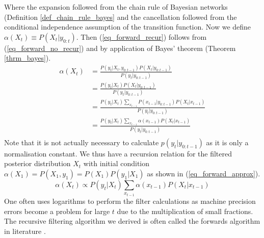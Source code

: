 Where the expansion followed from the chain rule of Bayesian networks (Definition \ref{def_chain_rule_bayes} and the cancellation followed from the conditional independence assumption of the transition function. Now we define $\alpha(X_t) \equiv P(X_t | y_{0:t})$. Then (\ref{eq_forward_recur}) follows from (\ref{eq_forward_no_recur}) and by application of Bayes' theorem (Theorem \ref{thrm_bayes}).
\begin{equation}
\begin{aligned}
\alpha(X_t) &= \frac{P(y_t|X_t, y_{0:t-1})P(X_t|y_{0:t-1})}{P(y_t|y_{0:t-1})} \\
& = \frac{P(y_t|X_t)P(X_t|y_{0:t-1})}{P(y_t|y_{0:t-1})} \\
& = \frac{P(y_t|X_t) \sum_{x_{t-1}} P(x_{t-1}|y_{0:t-1})P(X_t|x_{t-1})}{P(y_t|y_{0:t-1})} \\
& = \frac{P(y_t|X_t) \sum_{x_{t-1}} \alpha(x_{t-1})P(X_t|x_{t-1})}{P(y_t|y_{0:t-1})} \\
\end{aligned}
\label{eq_forward_recur}
\end{equation}
Note that it is not actually necessary to calculate $p(y_t|y_{0:t-1})$ as it is only a normalisation constant. We thus have a recursion relation for the filtered posterior distribution $X_t$ with initial condition $\alpha(X_1) = P(X_1, y_1) = P(X_1)P(y_1|X_1)$ as shown in (\ref{eq_forward_approx}).
\begin{equation}
\alpha(X_t) \propto P(y_t|X_t) \sum_{x_{t-1}} \alpha(x_{t-1})P(X_t|x_{t-1})
\label{eq_forward_approx}
\end{equation}
One often uses logarithms to perform the filter calculations as machine precision errors become a problem for large $t$ due to the multiplication of small fractions. The recursive filtering algorithm we derived is often called the forwards algorithm in literature \cite{barber}.


